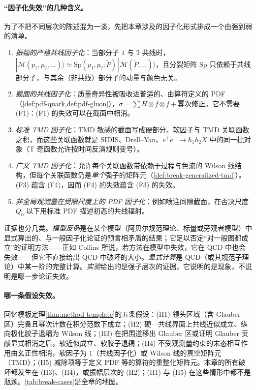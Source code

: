\paragraph{“因子化失效”的几种含义。}为了不把不同层次的陈述混为一谈，先把本章涉及的因子化形式排成一个由强到弱的清单。
\begin{enumerate}[label=(F\arabic*),leftmargin=2.6em,itemsep=1pt,topsep=2pt]
\item \emph{振幅的严格共线因子化}：当部分子 $1$ 与 $2$ 共线时，$|\mathcal M(p_1,p_2,\dots)\rangle\simeq\mathrm{Sp}(p_1,p_2;\tilde P)\,|\mathcal M(\tilde P,\dots)\rangle$，且分裂矩阵 $\mathrm{Sp}$ 只依赖于共线部分子，与其余（非共线）部分子的动量与颜色无关。
\item \emph{截面的共线因子化}：质量奇异性被吸收进普适的、由算符定义的 PDF（\cref{def:pdf-quark,def:pdf-gluon}），$\sigma=\sum H\otimes f\otimes f+$幂次修正。它不需要 (F1)：(F1) 的失效可以在截面中相消。
\item \emph{标准 TMD 因子化}：TMD 敏感的截面写成硬部分、软因子与 TMD 关联函数之积，而这些关联函数就是 SIDIS、Drell--Yan、$e^+e^-\to h_1h_2X$ 中的同一批对象（T 奇函数允许按时间反演规则变号）。
\item \emph{广义 TMD 因子化}：允许每个关联函数带依赖于过程与色流的 Wilson 线结构，但每个关联函数仍是\emph{单个}强子的矩阵元（\cref{def:break-generalized-tmd}）。(F3) 蕴含 (F4)，因而 (F4) 的失效蕴含 (F3) 的失效。
\item \emph{非全局观测量在受限尺度上的 PDF 因子化}：例如喷注间隙截面，在否决尺度 $Q_0$ 以下用标准 PDF 描述初态的共线辐射。
\end{enumerate}
证据也分几类。\emph{模型反例}是在某个模型（阿贝尔规范理论、标量或旁观者模型）中显式算出的、与一般因子化论证的预言相矛盾的结果；它足以否定“对一般图都成立”的证明方法——正如 Collins 所说，若方法在模型中失效，它在 QCD 中也会失效\cite{Collins2007}——但它不直接给出 QCD 中破坏的大小。\emph{显式计算}是 QCD（或其规范子理论）中某一阶的完整计算。\emph{实验}给出的是强子层次的证据，它说明的是现象，不说明是哪一步论证失效。

\paragraph{哪一条假设失效。}回忆模板定理\cref{thm:method-template}的五条假设：(H1) 领头区域（含 Glauber 区）完备且幂次计数在积分范数下成立；(H2) 硬—共线界面上共线近似成立、纵向极化胶子退耦为 Wilson 线；(H3) 在把围道移出 Glauber 区或证明 Glauber 贡献显式相消之后，软近似成立、软胶子退耦；(H4) 不受观测量约束的末态相互作用由幺正性相消，软因子为 $1$（共线因子化）或 Wilson 线的真空矩阵元（TMD）；(H5) 减除项等于定义 PDF 等的算符的重整化矩阵元。本章的所有破坏都发生在 (H3)、(H4)，或振幅层次的 (H2)；(H1) 与 (H5) 在这些情形中都不是瓶颈。\cref{tab:break-cases}是全章的地图。

